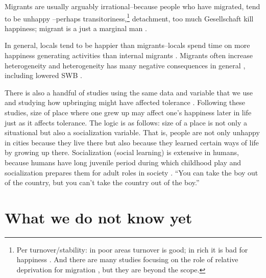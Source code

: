 \documentclass[10pt, letterpaper]{article}
\begin{document}
\begin{spacing}{2.0}

Migrants are usually arguably irrational--because people who have migrated,  tend to be unhappy \citep{knight10, bartram14, baltatescu07, hendriks14,jong02}--perhaps transitoriness,\footnote{Per turnover/stability: in poor areas turnover is good; in rich it is bad for happiness \citep{ross00}. And there are many studies focusing on the role of relative deprivation for migration \citep[e.g.,][]{stark91t}, but they are beyond the scope.}
detachment, too much Gesellschaft \citep{tonnies57} kill happiness; migrant is a just a marginal man \citep{park28}.
  
%
In general, locals tend to be happier than migrants--locals spend time on more happiness generating activities than internal migrants
\citep{hendriks14}. Migrants often increase heterogeneity and heterogeneity has
many negative consequences in general \citep{alesina99al,alesina00, putnam07},
 including lowered SWB \citep{aokrel,aokRel2,herbst14,vogt07,postmes02}.

There is also a handful of studies using the same data and variable that we use and studying 
how upbringing might have affected tolerance \citep{stephan82, tuch87}. Following these studies,  size of place
where one grew up may affect one's happiness later in life just as it affects tolerance. The
logic is as follows: size of a place is not only a situational but also a
socialization variable. That is, people are not only unhappy in cities because
they live there but also because they learned certain ways of life by growing up
there. 
% 
Socialization (social learning) is extensive in humans, because humans have
long juvenile period during which childhood play and socialization prepares them
for adult roles in society \citep{eagly10}. ``You can take the boy out of the country, but you can't
take the country out of the boy.'' %



\section*{What we do not know yet}


\end{spacing}
\end{document}

